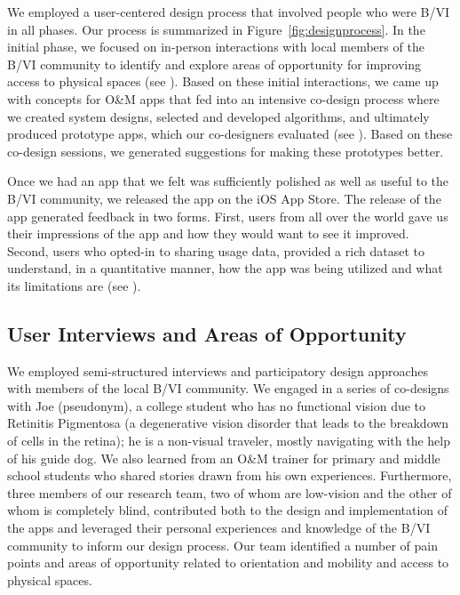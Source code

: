 \documentclass[chi_draft]{sigchi}
\newcommand{\BVI}{B/VI\xspace}
\newcommand{\OM}{O\&M\xspace}
\begin{document}
We employed a user-centered design process that involved people who were \BVI in all phases.  Our process is summarized in Figure~\ref{fig:designprocess}.  In the initial phase, we focused on in-person interactions with local members of the \BVI community to identify and explore areas of opportunity for improving access to physical spaces (see \emph{}).  Based on these initial interactions, we came up with concepts for \OM apps that fed into an intensive co-design process where we created system designs, selected and developed algorithms, and ultimately produced prototype apps, which our co-designers evaluated (see \emph{}).  Based on these co-design sessions, we generated suggestions for making these prototypes better.

Once we had an app that we felt was sufficiently polished as well as useful to the \BVI community, we released the app on the iOS App Store.  The release of the app generated feedback in two forms.  First, users from all over the world gave us their impressions of the app and how they would want to see it improved.  Second, users who opted-in to sharing usage data, provided a rich dataset to understand, in a quantitative manner, how the app was being utilized and what its limitations are (see \emph{}).

\subsection{User Interviews and Areas of Opportunity}\label{sec:areasofopportunity}
We employed semi-structured interviews and participatory design approaches \cite{buhler2001empowered, schuler1993participatory} with members of the local \BVI community.  We engaged in a series of co-designs with  Joe (pseudonym), a college student who has no functional vision due to Retinitis Pigmentosa (a degenerative vision disorder that leads to the breakdown of cells in the retina); he is a non-visual traveler, mostly navigating with the help of his guide dog. We also learned from an \OM trainer for primary and middle school students who shared stories drawn from his own experiences. Furthermore, three members of our research team, two of whom are low-vision and the other of whom is completely blind, contributed both to the design and implementation of the apps and leveraged their personal experiences and knowledge of the \BVI community to inform our design process. Our team identified a number of pain points and areas of opportunity related to orientation and mobility and access to physical spaces.
\end{document}
